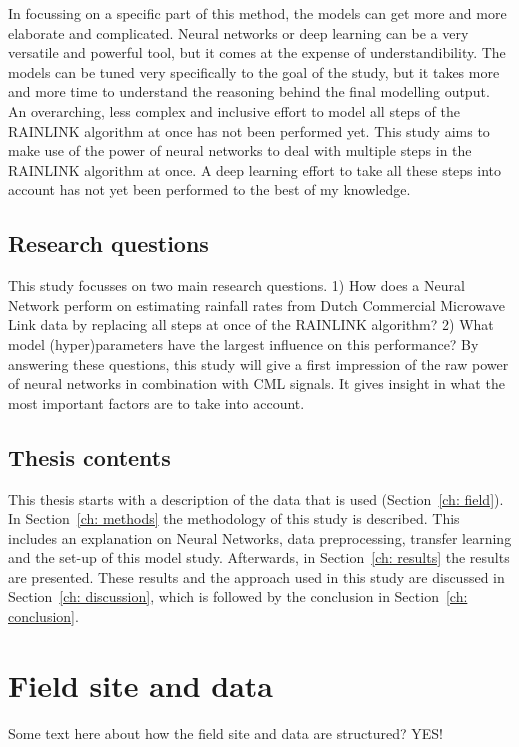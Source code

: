 \documentclass[twocolumn, 10pt, a4paper]{memoir}
\begin{document}
	In focussing on a specific part of this method, the models can get more and more elaborate and complicated. Neural networks or deep learning can be a very versatile and powerful tool, but it comes at the expense of understandibility. The models can be tuned very specifically to the goal of the study, but it takes more and more time to understand the reasoning behind the final modelling output. An overarching, less complex and inclusive effort to model all steps of the RAINLINK algorithm at once has not been performed yet. This study aims to make use of the power of neural networks to deal with multiple steps in the RAINLINK algorithm at once. A deep learning effort to take all these steps into account has not yet been performed to the best of my knowledge.  
	
	
	\section{Research questions}
	This study focusses on two main research questions.
	1) How does a Neural Network perform on estimating rainfall rates from Dutch Commercial Microwave Link data by replacing all steps at once of the RAINLINK algorithm?
	2) What model (hyper)parameters have the largest influence on this performance?
	By answering these questions, this study will give a first impression of the raw power of neural networks in combination with CML signals. It gives insight in what the most important factors are to take into account. 
	
	
	\section{Thesis contents}
	This thesis starts with a description of the data that is used (Section~\ref{ch: field}). In Section~\ref{ch: methods} the methodology of this study is described. This includes an explanation on Neural Networks, data preprocessing, transfer learning and the set-up of this model study. Afterwards, in Section~\ref{ch: results} the results are presented. These results and the approach used in this study are discussed in Section~\ref{ch: discussion}, which is followed by the conclusion in Section~\ref{ch: conclusion}.
	
	
	
	
	
	
	
	\cleardoublepage
	\chapter{Field site and data}\vspace{-6mm}
	\label{ch: field}
	Some text here about how the field site and data are structured? YES!
	
\end{document}
